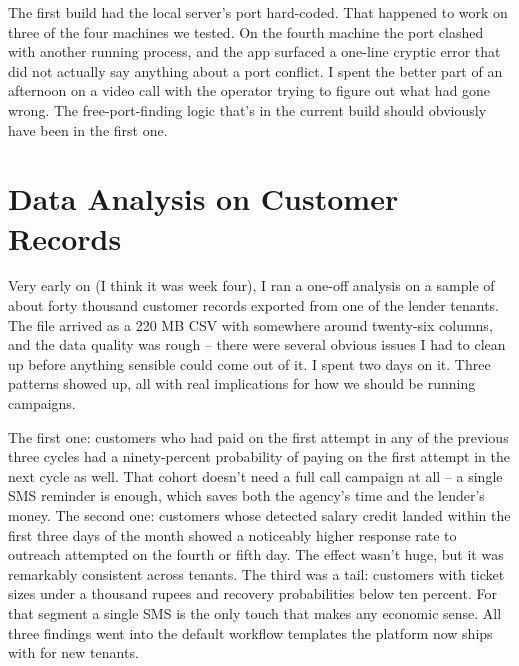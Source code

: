 The first build had the local server's port hard-coded. That happened to work on three of the four machines we tested. On the fourth machine the port clashed with another running process, and the app surfaced a one-line cryptic error that did not actually say anything about a port conflict. I spent the better part of an afternoon on a video call with the operator trying to figure out what had gone wrong. The free-port-finding logic that's in the current build should obviously have been in the first one.

\section{Data Analysis on Customer Records}
Very early on (I think it was week four), I ran a one-off analysis on a sample of about forty thousand customer records exported from one of the lender tenants. The file arrived as a 220 MB CSV with somewhere around twenty-six columns, and the data quality was rough -- there were several obvious issues I had to clean up before anything sensible could come out of it. I spent two days on it. Three patterns showed up, all with real implications for how we should be running campaigns.

The first one: customers who had paid on the first attempt in any of the previous three cycles had a ninety-percent probability of paying on the first attempt in the next cycle as well. That cohort doesn't need a full call campaign at all -- a single SMS reminder is enough, which saves both the agency's time and the lender's money. The second one: customers whose detected salary credit landed within the first three days of the month showed a noticeably higher response rate to outreach attempted on the fourth or fifth day. The effect wasn't huge, but it was remarkably consistent across tenants. The third was a tail: customers with ticket sizes under a thousand rupees and recovery probabilities below ten percent. For that segment a single SMS is the only touch that makes any economic sense. All three findings went into the default workflow templates the platform now ships with for new tenants.

